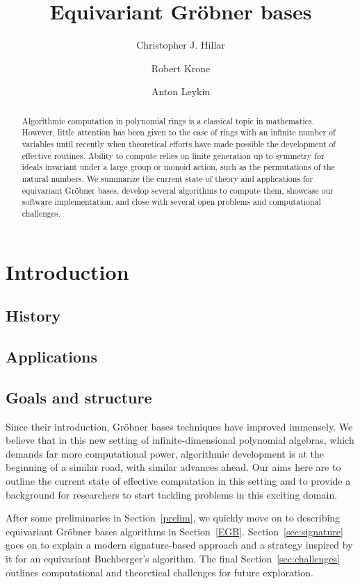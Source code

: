 \documentclass[]{aspm}
\title[Equivariant Gr\"obner bases]{Equivariant Gr\"obner bases}
\author[C.~Hillar]{Christopher J. Hillar}
\author[R.~Krone]{Robert Krone}
\author[A. Leykin]{Anton Leykin}
\begin{document}
\begin{abstract}
Algorithmic computation in polynomial rings is a classical topic in mathematics. However, little attention has been given to the case of rings with an infinite number of variables until recently when theoretical efforts have made possible the development of effective routines. Ability to compute relies on finite generation up to symmetry for ideals invariant under a large group or monoid action, such as the permutations of the natural numbers. We summarize the current state of theory and applications for equivariant Gr\"obner bases, develop several algorithms to compute them, showcase our software implementation, and close with several open problems and computational challenges.
\end{abstract}


\maketitle 
\section{Introduction}
\subsection{History}



\subsection{Applications}



\subsection{Goals and structure}

Since their introduction, Gr\"obner bases techniques have improved immensely.  We believe that in this new setting of infinite-dimensional polynomial algebras, which demands far more computational power, algorithmic development is at the beginning of a similar road, with similar advances ahead. Our aims here are to outline the current state of effective computation in this setting and to provide a background for researchers to start tackling problems in this exciting  domain. 

After some preliminaries in Section~\ref{prelim}, we quickly move on to describing equivariant Gr\"obner bases algorithms in Section~\ref{EGB}.  Section~\ref{sec:signature} goes on to explain a modern signature-based approach and a strategy inspired by it for an equivariant Buchberger's algorithm. The final Section~\ref{sec:challenges} outlines computational and theoretical challenges for future exploration.
\end{document}
